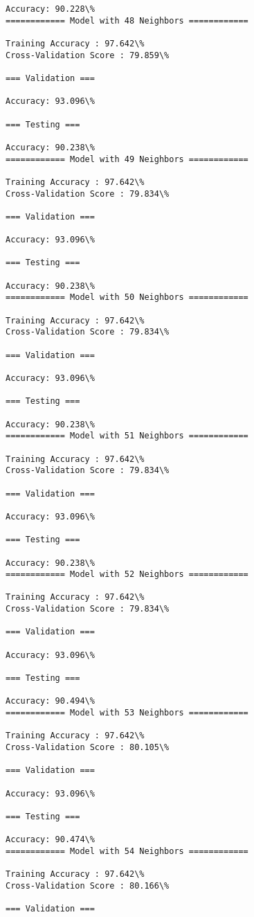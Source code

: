 \documentclass[11pt]{article}
\begin{document}
\begin{Verbatim}[commandchars=\\\{\}]
Accuracy: 90.228\%
============ Model with 48 Neighbors ============

Training Accuracy : 97.642\%
Cross-Validation Score : 79.859\%

=== Validation ===

Accuracy: 93.096\%

=== Testing ===

Accuracy: 90.238\%
============ Model with 49 Neighbors ============

Training Accuracy : 97.642\%
Cross-Validation Score : 79.834\%

=== Validation ===

Accuracy: 93.096\%

=== Testing ===

Accuracy: 90.238\%
============ Model with 50 Neighbors ============

Training Accuracy : 97.642\%
Cross-Validation Score : 79.834\%

=== Validation ===

Accuracy: 93.096\%

=== Testing ===

Accuracy: 90.238\%
============ Model with 51 Neighbors ============

Training Accuracy : 97.642\%
Cross-Validation Score : 79.834\%

=== Validation ===

Accuracy: 93.096\%

=== Testing ===

Accuracy: 90.238\%
============ Model with 52 Neighbors ============

Training Accuracy : 97.642\%
Cross-Validation Score : 79.834\%

=== Validation ===

Accuracy: 93.096\%

=== Testing ===

Accuracy: 90.494\%
============ Model with 53 Neighbors ============

Training Accuracy : 97.642\%
Cross-Validation Score : 80.105\%

=== Validation ===

Accuracy: 93.096\%

=== Testing ===

Accuracy: 90.474\%
============ Model with 54 Neighbors ============

Training Accuracy : 97.642\%
Cross-Validation Score : 80.166\%

=== Validation ===


\end{Verbatim}
\end{document}
